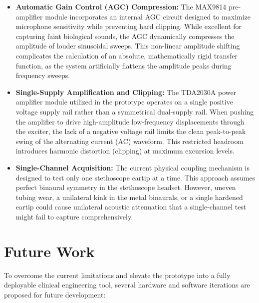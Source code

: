 \begin{itemize}
    \item \textbf{Automatic Gain Control (AGC) Compression:} The MAX9814 pre-amplifier module incorporates an internal AGC circuit designed to maximize microphone sensitivity while preventing hard clipping. While excellent for capturing faint biological sounds, the AGC dynamically compresses the amplitude of louder sinusoidal sweeps. This non-linear amplitude shifting complicates the calculation of an absolute, mathematically rigid transfer function, as the system artificially flattens the amplitude peaks during frequency sweeps.
    \item \textbf{Single-Supply Amplification and Clipping:} The TDA2030A power amplifier module utilized in the prototype operates on a single positive voltage supply rail rather than a symmetrical dual-supply rail. When pushing the amplifier to drive high-amplitude low-frequency displacements through the exciter, the lack of a negative voltage rail limits the clean peak-to-peak swing of the alternating current (AC) waveform. This restricted headroom introduces harmonic distortion (clipping) at maximum excursion levels.
    \item \textbf{Single-Channel Acquisition:} The current physical coupling mechanism is designed to test only one stethoscope eartip at a time. This approach assumes perfect binaural symmetry in the stethoscope headset. However, uneven tubing wear, a unilateral kink in the metal binaurals, or a single hardened eartip could cause unilateral acoustic attenuation that a single-channel test might fail to capture comprehensively.
\end{itemize}

\section{Future Work}

To overcome the current limitations and elevate the prototype into a fully deployable clinical engineering tool, several hardware and software iterations are proposed for future development:

